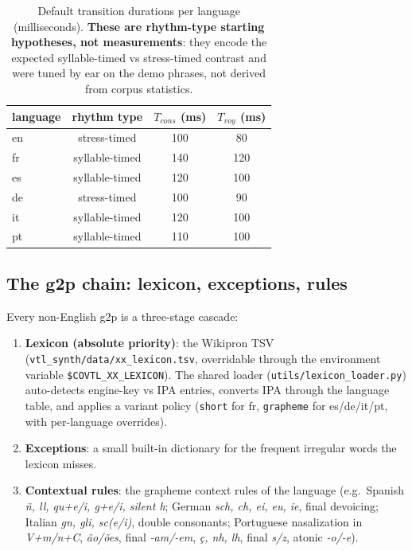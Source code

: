 \documentclass[11pt,a4paper]{article}
\newcommand{\code}[1]{\texttt{#1}}
\begin{document}
\begin{table}[htbp]
\centering
\caption{Default transition durations per language
(milliseconds). \textbf{These are rhythm-type starting hypotheses,
not measurements}: they encode the expected syllable-timed vs
stress-timed contrast and were tuned by ear on the demo phrases, not
derived from corpus statistics.}
\label{tab:timings}
\begin{tabular}{lccc}
\toprule
language & rhythm type & $T_{cons}$ (ms) & $T_{voy}$ (ms) \\
\midrule
en & stress-timed & 100 & 80 \\
fr & syllable-timed & 140 & 120 \\
es & syllable-timed & 120 & 100 \\
de & stress-timed & 100 & 90 \\
it & syllable-timed & 120 & 100 \\
pt & syllable-timed & 110 & 100 \\
\bottomrule
\end{tabular}
\end{table}

\subsection{The g2p chain: lexicon, exceptions, rules}

Every non-English g2p is a three-stage cascade:

\begin{enumerate}
\item \textbf{Lexicon (absolute priority)}: the Wikipron TSV
      (\code{vtl\_synth/data/xx\_lexicon.tsv}, overridable through
      the environment variable \code{\$COVTL\_XX\_LEXICON}). The
      shared loader (\code{utils/lexicon\_loader.py}) auto-detects
      engine-key vs IPA entries, converts IPA through the language
      table, and applies a variant policy (\code{short} for fr,
      \code{grapheme} for es/de/it/pt, with per-language overrides).
\item \textbf{Exceptions}: a small built-in dictionary for the
      frequent irregular words the lexicon misses.
\item \textbf{Contextual rules}: the grapheme context rules of the
      language (e.g.\ Spanish \emph{\~n, ll, qu+e/i, g+e/i, silent h};
      German \emph{sch, ch, ei, eu, ie}, final devoicing; Italian
      \emph{gn, gli, sc(e/i)}, double consonants; Portuguese
      nasalization in \emph{V+m/n+C}, \emph{\~ao/\~oes}, final
      \emph{-am/-em}, \emph{\c{c}, nh, lh}, final \emph{s/z},
      atonic \emph{-o/-e}).
\end{enumerate}
\end{document}
